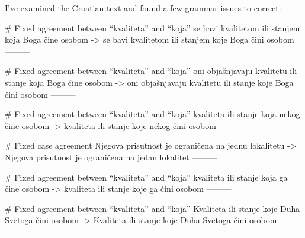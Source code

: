 I've examined the Croatian text and found a few grammar issues to correct:

# Fixed agreement between “kvaliteta” and “koja”
se bavi kvalitetom ili stanjem koja Boga čine osobom
->
se bavi kvalitetom ili stanjem koje Boga čini osobom
---------

# Fixed agreement between “kvaliteta” and “koja”
oni objašnjavaju kvalitetu ili stanje koja Boga čine osobom
->
oni objašnjavaju kvalitetu ili stanje koje Boga čini osobom
---------

# Fixed agreement between “kvaliteta” and “koja”
kvaliteta ili stanje koja nekog čine osobom
->
kvaliteta ili stanje koje nekog čini osobom
---------

# Fixed case agreement
Njegova prisutnost je ograničena na jednu lokalitetu
->
Njegova prisutnost je ograničena na jedan lokalitet
---------

# Fixed agreement between “kvaliteta” and “koja”
kvaliteta ili stanje koja ga čine osobom
->
kvaliteta ili stanje koje ga čini osobom
---------

# Fixed agreement between “kvaliteta” and “koja”
Kvaliteta ili stanje koje Duha Svetoga čini osobom
->
Kvaliteta ili stanje koje Duha Svetoga čini osobom
---------